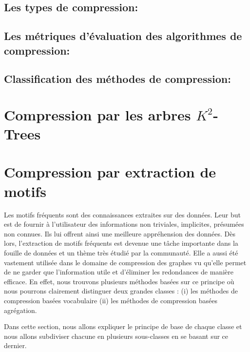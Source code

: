 \documentclass[a4paper,oneside,12pt]{report}
\theoremstyle{definition}
\begin{document}
	
			\subsection{Les types de compression:}
			
			
	
			\subsection{Les métriques d'évaluation des algorithmes de compression:}
				
			
			\subsection{Classification des méthodes de compression:}
				
				
			\section{Compression par les arbres $K^2$-Trees}
				
				
			\section{Compression par extraction de motifs}
			 Les motifs fréquents sont des connaissances extraites sur des données. Leur but est de fournir à l'utilisateur des informations non triviales, implicites, présumées non connues. Ils lui offrent ainsi une meilleure appréhension des données. Dès lors, l'extraction de motifs fréquents est  devenue une tâche importante dans la fouille de données et un thème très étudié par la communauté. Elle a aussi été vastement %
			 utilisée dans le domaine de compression des graphes vu qu'elle permet de ne garder que l'information utile et d'éliminer les redondances de manière efficace. En effet, nous trouvons plusieurs méthodes basées sur ce principe où nous pourrons clairement distinguer deux grandes classes : 
			 (i) les méthodes de compression basées vocabulaire
			 (ii) les méthodes de compression basées agrégation.
			 
				Dans cette section, nous allons expliquer le principe de base de chaque classe et nous allons subdiviser chacune en plusieurs sous-classes en se basant sur ce dernier. 
			 
\end{document}
